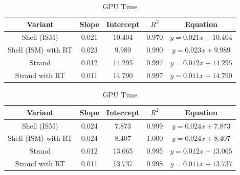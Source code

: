 \documentclass{article}
\begin{document}
\begin{table}[htbp]
\caption{Base Test Linear Fit Results}
\label{table:base-fit}
\centering

\begin{subtable}{\linewidth}
\centering
\caption{Frame Time}
\label{table:base-fit-ft}
\begin{tabular}{c c c c c}
\hline\hline
Variant & Slope & Intercept & $R^2$ & Equation \\ [0.5ex]
\hline
Shell (ISM) & 0.021 & 10.404 & 0.970 & $y = 0.021x + 10.404$ \\
Shell (ISM) with RT & 0.023 & 9.989 & 0.990 & $y = 0.023x + 9.989$ \\
Strand & 0.012 & 14.295 & 0.997 & $y = 0.012x + 14.295$ \\
Strand with RT & 0.011 & 14.790 & 0.997 & $y = 0.011x + 14.790$ \\ [1ex]
\hline
\end{tabular}
\end{subtable}

\vspace{1em}

\begin{subtable}{\linewidth}
\centering
\caption{GPU Time}
\label{table:base-fit-gpu}
\begin{tabular}{c c c c c}
\hline\hline
Variant & Slope & Intercept & $R^2$ & Equation \\ [0.5ex]
\hline
Shell (ISM) & 0.024 & 7.873 & 0.999 & $y = 0.024x + 7.873$ \\
Shell (ISM) with RT & 0.024 & 8.407 & 1.000 & $y = 0.024x + 8.407$ \\
Strand & 0.012 & 13.065 & 0.995 & $y = 0.012x + 13.065$ \\
Strand with RT & 0.011 & 13.737 & 0.998 & $y = 0.011x + 13.737$ \\ [1ex]
\hline
\end{tabular}
\end{subtable}
\end{table}
\end{document}
